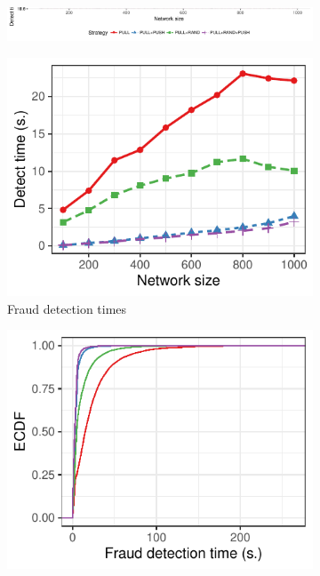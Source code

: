 \begin{figure}[t]
	\centering
	\begin{subfigure}{\columnwidth}
		\centering
		\includegraphics[width=\linewidth]{trustchain/assets/fraud_experiments_legend}
	\end{subfigure}
	\begin{subfigure}{.66\columnwidth}
		\centering
		\includegraphics[width=\linewidth]{trustchain/assets/fraud_experiment_dynamic_tx}
		\caption{Fraud detection times}
		\label{fig:fraud_experiment_dynamic_tx_time}
	\end{subfigure}%
	\begin{subfigure}{.66\columnwidth}
		\centering
		\includegraphics[width=\columnwidth]{trustchain/assets/fraud_experiment_detect_times_dynamic_1000}

\end{subfigure}
\end{figure}
